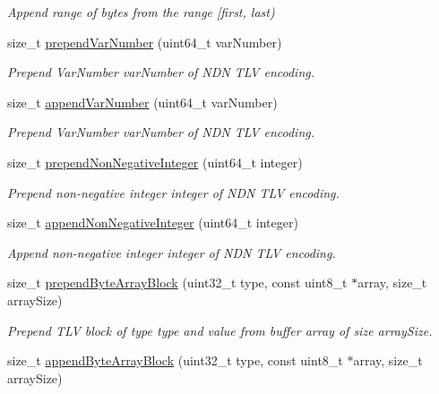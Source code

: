 \begin{DoxyCompactItemize}
\begin{DoxyCompactList}\small\item\em Append range of bytes from the range \mbox{[}{\ttfamily first}, {\ttfamily last}) \end{DoxyCompactList}\item 
size\+\_\+t \hyperlink{classndn_1_1encoding_1_1Encoder_af864de9dc84d1e6b872e4486f56dd308}{prepend\+Var\+Number} (uint64\+\_\+t var\+Number)
\begin{DoxyCompactList}\small\item\em Prepend Var\+Number {\ttfamily var\+Number} of N\+DN T\+LV encoding. \end{DoxyCompactList}\item 
size\+\_\+t \hyperlink{classndn_1_1encoding_1_1Encoder_a760930a359053a7fe2363a2d7a3106e7}{append\+Var\+Number} (uint64\+\_\+t var\+Number)
\begin{DoxyCompactList}\small\item\em Prepend Var\+Number {\ttfamily var\+Number} of N\+DN T\+LV encoding. \end{DoxyCompactList}\item 
size\+\_\+t \hyperlink{classndn_1_1encoding_1_1Encoder_a83a39ad200bb0f55f0c615b3907632b4}{prepend\+Non\+Negative\+Integer} (uint64\+\_\+t integer)
\begin{DoxyCompactList}\small\item\em Prepend non-\/negative integer {\ttfamily integer} of N\+DN T\+LV encoding. \end{DoxyCompactList}\item 
size\+\_\+t \hyperlink{classndn_1_1encoding_1_1Encoder_ac47943e2b053cd801e282f97edf2b99c}{append\+Non\+Negative\+Integer} (uint64\+\_\+t integer)
\begin{DoxyCompactList}\small\item\em Append non-\/negative integer {\ttfamily integer} of N\+DN T\+LV encoding. \end{DoxyCompactList}\item 
size\+\_\+t \hyperlink{classndn_1_1encoding_1_1Encoder_afaa656e23f557204c7a484ff3ab2f50e}{prepend\+Byte\+Array\+Block} (uint32\+\_\+t type, const uint8\+\_\+t $\ast$array, size\+\_\+t array\+Size)\hypertarget{classndn_1_1encoding_1_1Encoder_afaa656e23f557204c7a484ff3ab2f50e}{}\label{classndn_1_1encoding_1_1Encoder_afaa656e23f557204c7a484ff3ab2f50e}

\begin{DoxyCompactList}\small\item\em Prepend T\+LV block of type {\ttfamily type} and value from buffer {\ttfamily array} of size {\ttfamily array\+Size}. \end{DoxyCompactList}\item 
size\+\_\+t \hyperlink{classndn_1_1encoding_1_1Encoder_aa9f33a1dd5bda58caeeaa14447fbf3bf}{append\+Byte\+Array\+Block} (uint32\+\_\+t type, const uint8\+\_\+t $\ast$array, size\+\_\+t array\+Size)\hypertarget{classndn_1_1encoding_1_1Encoder_aa9f33a1dd5bda58caeeaa14447fbf3bf}{}\label{classndn_1_1encoding_1_1Encoder_aa9f33a1dd5bda58caeeaa14447fbf3bf}


\end{DoxyCompactItemize}
